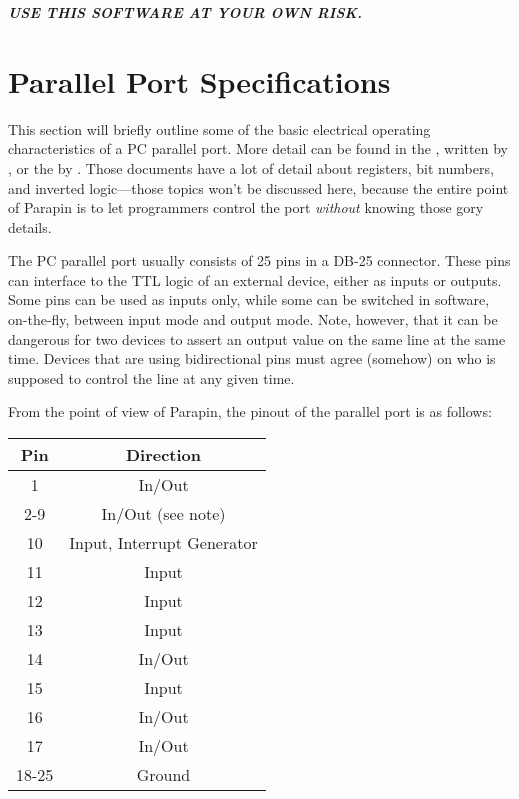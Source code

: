 \documentclass{article}
\begin{document}
{\em {\bf USE THIS SOFTWARE AT YOUR OWN RISK.}}


\section{Parallel Port Specifications}
\label{specs}

This section will briefly outline some of the basic electrical
operating characteristics of a PC parallel port.  More detail can be
found in the , written by
, or the
by .  Those
documents have a lot of detail about registers, bit numbers, and
inverted logic---those topics won't be discussed here, because the
entire point of Parapin is to let programmers control the port {\em
without} knowing those gory details.

The PC parallel port usually consists of 25 pins in a DB-25 connector.
These pins can interface to the TTL logic of an external device,
either as inputs or outputs.  Some pins can be used as inputs only,
while some can be switched in software, on-the-fly, between input mode
and output mode.  Note, however, that it can be dangerous for two
devices to assert an output value on the same line at the same time.
Devices that are using bidirectional pins must agree (somehow) on who
is supposed to control the line at any given time.

From the point of view of Parapin, the pinout of the parallel port is
as follows:

\begin{center}
\begin{tabular}{|c|c|}
\hline
Pin  &  Direction \\
\hline
1 & In/Out \\
\hline
2-9 & In/Out (see note) \\
\hline
10 & Input, Interrupt Generator \\
\hline
11 & Input \\
\hline
12 & Input \\
\hline
13 & Input \\
\hline
14 & In/Out \\
\hline
15 & Input \\
\hline
16 & In/Out \\
\hline
17 & In/Out \\
\hline
18-25 & Ground \\
\hline
\end{tabular}
\end{center}
\end{document}
